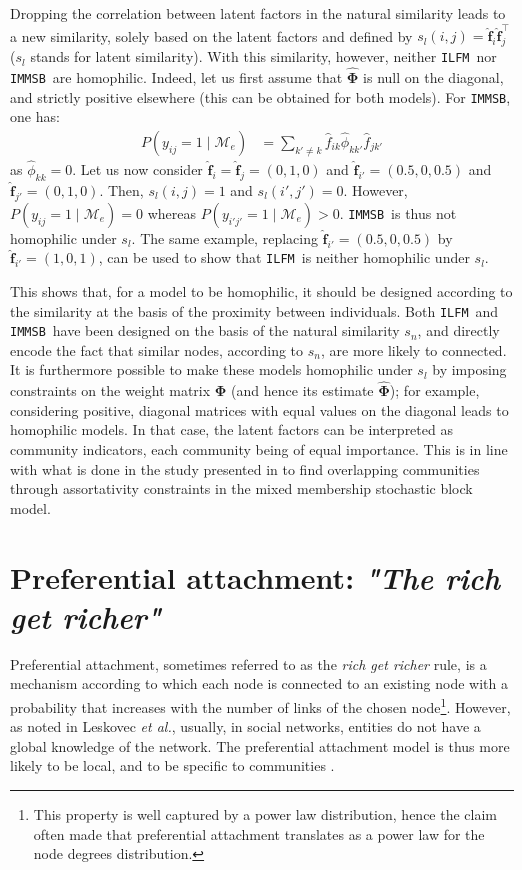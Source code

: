 \documentclass[journal]{IEEEtran}
\newcommand{\ifm}{\texttt{ILFM}}
\newcommand{\imb}{\texttt{IMMSB}}
\newcommand{\pr}{P}
\newcommand{\M}{\mathcal{M}}
\newcommand{\mat}[1]{\mathbf{#1}}
\begin{document}
Dropping the correlation between latent factors in the natural similarity leads to a new similarity, solely based on the latent factors and defined by $s_l(i,j) = \mat{\hat{f}}_{i} \mat{\hat{f}}_j^\top \nonumber$ ($s_l$ stands for latent similarity). With this similarity, however, neither \ifm\  nor \imb\ are homophilic. Indeed, let us first assume that $\mat{\hat{\Phi}}$ is null on the diagonal, and strictly positive elsewhere (this can be obtained for both models). For \imb, one has:
%
\begin{align}
\pr(y_{ij}=1 \mid \M_e) & = \sum_{k' \neq k} \hat{f}_{ik} \hat{\phi}_{kk'} \hat{f}_{jk'} \nonumber 
\end{align}
%
as $\hat{\phi}_{kk} = 0$. Let us now consider $\mat{\hat{f}}_i=\mat{\hat{f}}_j=(0,1,0)$ and $\mat{\hat{f}}_{i'}=(0.5,0,0.5)$ and $\mat{\hat{f}}_{j'}=(0,1,0)$. Then, $s_l(i,j)=1$ and $s_l(i',j')=0$. However, $\pr(y_{ij}=1 \mid \M_e) = 0$ whereas $\pr(y_{i'j'}=1 \mid \M_e) > 0$. \imb\ is thus not homophilic under $s_l$. The same example, replacing $\mat{\hat{f}}_{i'}=(0.5,0,0.5)$ by $\mat{\hat{f}}_{i'}=(1,0,1)$, can be used to show that \ifm\ is neither homophilic under $s_l$.

This shows that, for a model to be homophilic, it should be designed according to the similarity at the basis of the proximity between individuals. Both \ifm\ and \imb\ have been designed on the basis of the natural similarity $s_n$, and directly encode the fact that similar nodes, according to $s_n$, are more likely to connected.  It is furthermore possible to make these models homophilic under $s_l$ by imposing constraints on the weight matrix $\mat{\Phi}$ (and hence its estimate $\mat{\hat{\Phi}}$); for example, considering positive, diagonal matrices with equal values on the diagonal leads to homophilic models. In that case, the latent factors can be interpreted as community indicators, each community being of equal importance. This is in line with what is done in the study presented in \cite{AMMSB} to find overlapping communities through assortativity constraints in the mixed membership stochastic block model.

\section{Preferential attachment: \emph{"The rich get richer"}}
\label{sec:burstiness}

Preferential attachment, sometimes referred to as the \textit{rich get richer} rule, is a mechanism according to which each node is connected to an existing node with a probability that increases with the number of links of the chosen node\footnote{This property is well captured by a power law distribution, hence the claim often made that preferential attachment translates as a power law for the node degrees distribution.}. However, as noted in Leskovec \textit{et al.}, usually, in social networks, entities do not have a global knowledge of the network. The preferential attachment model is thus more likely to be local, and to be specific to communities \cite{LeskovecBKT08}.
\end{document}
